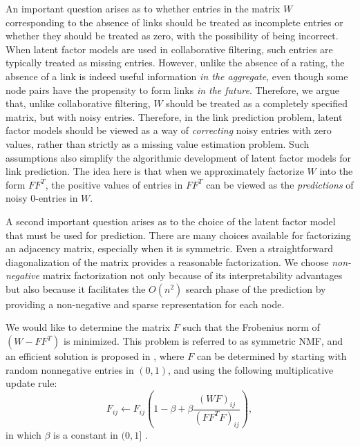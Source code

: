 \documentclass[10pt,journal,compsoc]{IEEEtran}
\newcommand{\NMF}{{\sf NMF}\xspace }
\begin{document}
An important question arises as to whether entries in the matrix $W$
corresponding to the absence of links should be treated as incomplete
entries or whether they should be treated as zero, with the possibility
of being incorrect. When latent factor models are used in
collaborative filtering, such entries are typically treated as
missing entries. However, unlike the absence of a rating, the
absence of a link is indeed useful information {\em in the
aggregate}, even though some node pairs have the propensity to form
links {\em in the future}. Therefore, we argue that, unlike
collaborative filtering, $W$ should be treated as a completely
specified matrix, but with noisy entries. Therefore, in the link
prediction problem, latent factor models should be viewed as a way
of {\em correcting} noisy entries with zero values, rather than
strictly as a missing value estimation problem.  Such assumptions
also simplify the algorithmic development of latent factor models
for link prediction. The idea here is that when we approximately
factorize $W$ into the form  $F F^T$, the positive values of entries in
$F F^T$ can be viewed as the {\em predictions} of  noisy 0-entries in
$W$.

A second important question arises as to the choice of the latent
factor model that must be used for prediction. There are many
choices available for factorizing an adjacency matrix, especially
when it is symmetric. Even a
straightforward diagonalization of the matrix provides a reasonable
factorization. We  choose {\em non-negative} matrix factorization
not only because of its interpretability advantages but also because
it facilitates the  $O(n^2)$ search phase of the prediction by
providing a non-negative and sparse representation for each node.

We would like to determine the matrix $F$ such that the Frobenius
norm of $( W - F F^T)$ is minimized.  This problem is referred to as
symmetric \NMF, and an efficient solution is proposed in
\cite{long}, where $F$ can be determined by starting with random
nonnegative entries in $(0, 1)$, and using the following
multiplicative update rule:
\begin{equation}
\label{equation-update}
F_{ij} \leftarrow F_{ij} ( 1 - \beta + \beta \frac{(W F)_{ij} }{(F F^T F)_{ij}} ),
\end{equation}
in which $\beta$ is a constant in $( 0, 1]$ \cite{ding}.
\end{document}

